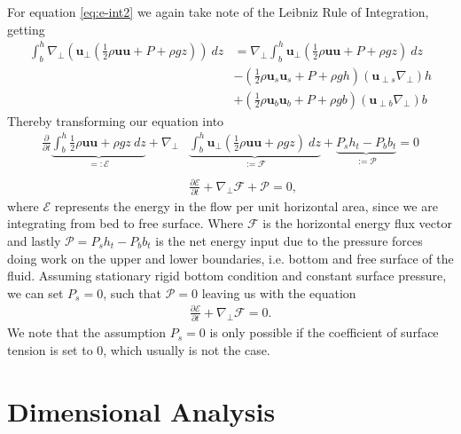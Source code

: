 For equation \ref{eq:e-int2} we again take note of the Leibniz Rule of
Integration, getting
\begin{align}
    \int_b^h \nabla_\perp\left( \mathbf{u}_\perp\left(
    \frac{1}{2}\rho\mathbf{u}\mathbf{u}+P+\rho gz \right)  \right)\
    dz
    &= \nabla_\perp \int_b^h \mathbf{u}_\perp\left(
    \frac{1}{2}\rho\mathbf{u}\mathbf{u} + P + \rho g z \right) \ dz\\
    &- \left( \frac{1}{2}\rho \mathbf{u}_s\mathbf{u}_s + P + \rho g h \right)
    \left( \mathbf{u}_{\perp s} \nabla_\perp \right) h\\
    &+\left( \frac{1}{2}\rho \mathbf{u}_b\mathbf{u}_b + P + \rho g b \right)
    \left( \mathbf{u}_{\perp b} \nabla_\perp \right) b
\end{align}
Thereby transforming our equation into
\begin{align}
    \frac{\partial }{\partial t} \underbrace{\int_b^h \frac{1}{2}\rho
    \mathbf{u}\mathbf{u}+\rho g z\ dz}_{=:\mathcal{E}}
    + \nabla_\perp&\underbrace{\int_b^h
    \mathbf{u}_\perp\left( \frac{1}{2}\rho\mathbf{u}\mathbf{u} + \rho g z
\right)\ dz}_{:=\mathcal{F}}
+ \underbrace{P_s h_t - P_b b_t}_{:=\mathcal{P}} = 0\\
\nonumber\\
    &\frac{\partial \mathcal{E}}{\partial t}
    + \nabla_\perp \mathcal{F} + \mathcal{P} = 0,
\end{align}
where $\mathcal{E}$ represents the energy in the flow per unit horizontal
area, since we are integrating from bed to free surface. Where $\mathcal{F}$
is the horizontal energy flux vector and lastly $\mathcal{P} = P_s h_t -
P_b b_t$ is the net energy input due to the pressure forces doing work on the
upper and lower boundaries, i.e. bottom and free surface of the fluid.
Assuming stationary rigid bottom condition and constant surface pressure, we
can set $P_s=0$, such that $\mathcal{P} =0$ leaving us with the equation
\begin{align}
    \frac{\partial \mathcal{E}}{\partial t}
    + \nabla_\perp \mathcal{F} = 0.
\end{align}
We note that the assumption $P_s=0$ is only possible if the coefficient of
surface tension is set to 0, which usually is not the case.
\section{Dimensional Analysis}




\newpage




\nocite{johnson_1997}
\nocite{vallis_2017}
\nocite{constantin_tsunami}
\nocite{rupert_2009}
\nocite{mathe-physik}

\printbibliography


